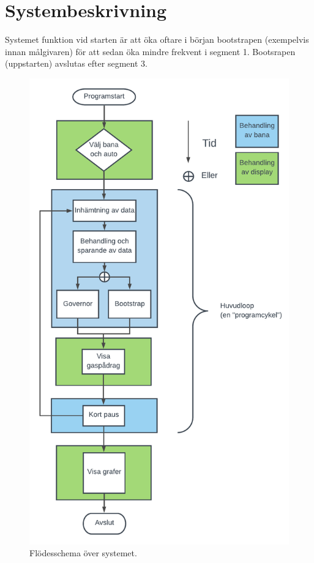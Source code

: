 \section{Systembeskrivning}
Systemet funktion vid starten är att öka oftare i början bootstrapen (exempelvis innan målgivaren) för att sedan öka mindre frekvent i segment 1. Bootsrapen (uppstarten) avslutas efter segment 3. 
\begin{figure}
	\centering
	\includegraphics [height=0.8\textheight] {Figures/flow}
	\caption{Flödesschema över systemet.}
	\label{fig:flow}
\end{figure}

